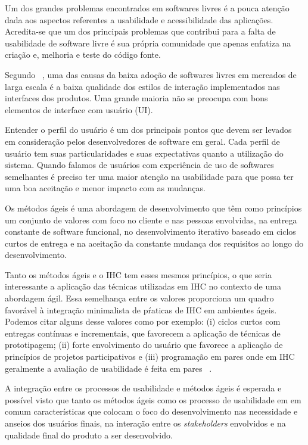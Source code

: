 Um dos grandes problemas encontrados em softwares livres é a pouca atenção dada aos aspectos referentes a usabilidade e acessibilidade das aplicações. Acredita-se que um dos principais problemas que contribui para a falta de usabilidade de software livre é sua própria comunidade que apenas enfatiza na criação e, melhoria e teste do código fonte.  

Segundo ~\cite{preece2007}, uma das causas da baixa adoção de softwares livres em mercados de larga escala é a baixa qualidade dos estilos de interação implementados nas interfaces dos produtos. Uma grande maioria não se preocupa com bons elementos de interface com usuário (UI).

Entender o perfil do usuário é um dos principais pontos que devem ser levados em consideração pelos desenvolvedores de software em geral. Cada perfil de usuário tem suas particularidades e suas expectativas quanto a utilização do sistema. Quando falamos de usuários com experiência de uso de softwares semelhantes é preciso ter uma maior atenção na usabilidade para que possa ter uma boa aceitação e menor impacto com as mudanças.

Os métodos ágeis é uma abordagem de desenvolvimento que têm como princípios um conjunto de valores com foco no cliente e nas pessoas envolvidas, na entrega constante de software funcional, no desenvolvimento iterativo baseado em ciclos curtos de entrega e na aceitação da constante mudança dos requisitos ao longo do desenvolvimento. 

	Tanto os métodos ágeis e o IHC tem esses mesmos princípios, o que seria interessante a aplicação das técnicas utilizadas em IHC no contexto de uma abordagem ágil. Essa semelhança entre os valores proporciona um quadro favorável à integração minimalista de pŕaticas de IHC em ambientes ágeis. Podemos citar alguns desse valores como por exemplo: (i) ciclos curtos com entregas contínuas e incrementais, que favorecem a aplicação de técnicas de prototipagem; (ii) forte envolvimento do usuário que favorece a aplicação de princípios de projetos participativos e (iii) programação em pares onde em IHC geralmente a avaliação de usabilidade é feita em pares ~\cite{barbosa2008estrategia}. 

A integração entre os processos de usabilidade e métodos ágeis é esperada e possível visto que tanto os métodos ágeis como os processo de usabilidade em em comum características que colocam o foco do desenvolvimento nas necessidade e anseios dos usuários finais, na interação entre os \textit{stakeholders} envolvidos e na qualidade final do produto a ser desenvolvido.